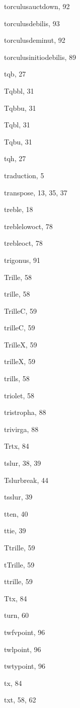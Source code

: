 \begin{theindex}
  \item {\Bslash torculusauctdown}, 92
  \item {\Bslash torculusdebilis}, 93
  \item {\Bslash torculusdeminut}, 92
  \item {\Bslash torculusinitiodebilis}, 89
  \item {\Bslash tqb}, 27
  \item {\Bslash Tqbbl}, 31
  \item {\Bslash Tqbbu}, 31
  \item {\Bslash Tqbl}, 31
  \item {\Bslash Tqbu}, 31
  \item {\Bslash tqh}, 27
  \item traduction, 5
  \item {\Bslash transpose}, 13, 35, 37
  \item {\Bslash treble}, 18
  \item {\Bslash treblelowoct}, 78
  \item {\Bslash trebleoct}, 78
  \item {\Bslash trigonus}, 91
  \item {\Bslash Trille}, 58
  \item {\Bslash trille}, 58
  \item {\Bslash TrilleC}, 59
  \item {\Bslash trilleC}, 59
  \item {\Bslash TrilleX}, 59
  \item {\Bslash trilleX}, 59
  \item trills, 58
  \item {\Bslash triolet}, 58
  \item {\Bslash tristropha}, 88
  \item {\Bslash trivirga}, 88
  \item {\Bslash Trtx}, 84
  \item {\Bslash tslur}, 38, 39
  \item {\Bslash Tslurbreak}, 44
  \item {\Bslash tsslur}, 39
  \item {\Bslash tten}, 40
  \item {\Bslash ttie}, 39
  \item {\Bslash Ttrille}, 59
  \item {\Bslash tTrille}, 59
  \item {\Bslash ttrille}, 59
  \item {\Bslash Ttx}, 84
  \item {\Bslash turn}, 60
  \item {\Bslash twfvpoint}, 96
  \item {\Bslash twlpoint}, 96
  \item {\Bslash twtypoint}, 96
  \item {\Bslash tx}, 84
  \item {\Bslash txt}, 58, 62


\end{theindex}
